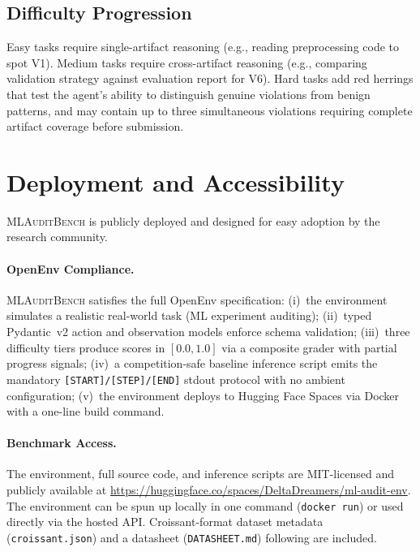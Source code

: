 \documentclass{article}
\begin{document}
\subsection{Difficulty Progression}

Easy tasks require single-artifact reasoning (e.g., reading preprocessing
code to spot V1).  Medium tasks require cross-artifact reasoning (e.g.,
comparing validation strategy against evaluation report for V6).  Hard
tasks add red herrings that test the agent's ability to distinguish
genuine violations from benign patterns, and may contain up to three
simultaneous violations requiring complete artifact coverage before submission.

\section{Deployment and Accessibility}
\label{sec:deployment}

\textsc{MLAuditBench} is publicly deployed and designed for easy adoption
by the research community.

\paragraph{OpenEnv Compliance.}
\textsc{MLAuditBench} satisfies the full OpenEnv specification:
(i)~the environment simulates a realistic real-world task (ML experiment auditing);
(ii)~typed Pydantic~v2 action and observation models enforce schema validation;
(iii)~three difficulty tiers produce scores in $[0.0, 1.0]$ via a composite
grader with partial progress signals;
(iv)~a competition-safe baseline inference script emits the mandatory
\texttt{[START]/[STEP]/[END]} stdout protocol with no ambient configuration;
(v)~the environment deploys to Hugging Face Spaces via Docker with a one-line
build command.

\paragraph{Benchmark Access.}
The environment, full source code, and inference scripts are MIT-licensed and
publicly available at \url{https://huggingface.co/spaces/DeltaDreamers/ml-audit-env}.
The environment can be spun up locally in one command (\texttt{docker run}) or used
directly via the hosted API.  Croissant-format dataset metadata (\texttt{croissant.json})
and a datasheet (\texttt{DATASHEET.md}) following \citet{gebru2021datasheets} are included.
\end{document}
